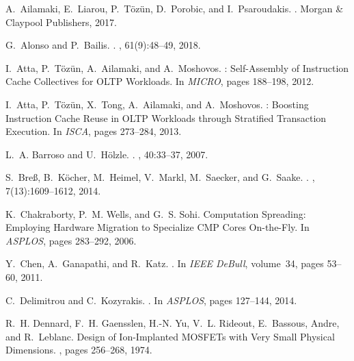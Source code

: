 \documentclass[11pt]{article}
\begin{document}
\begin{thebibliography}{10}
\begin{small}
\itemsep=1pt
%
%
A.~Ailamaki, E.~Liarou, P.~T\"oz\"un, D.~Porobic, and I.~Psaroudakis.
.
\newblock Morgan {\&} Claypool Publishers, 2017.

G.~Alonso and P.~Bailis.
.
, 61(9):48--49, 2018.

I.~Atta, P.~T\"oz\"un, A.~Ailamaki, and A.~Moshovos.
: {S}elf-{A}ssembly of {I}nstruction {C}ache {C}ollectives for
  {OLTP} {W}orkloads.
\newblock In {\em MICRO}, pages 188--198, 2012.

I.~Atta, P.~T\"oz\"un, X.~Tong, A.~Ailamaki, and A.~Moshovos.
: {B}oosting {I}nstruction {C}ache {R}euse in {OLTP}
  {W}orkloads through {S}tratified {T}ransaction {E}xecution.
\newblock In {\em ISCA}, pages 273--284, 2013.

L.~A. Barroso and U.~H\"{o}lzle.
.
, 40:33--37, 2007.

S.~Bre\ss, B.~K\"{o}cher, M.~Heimel, V.~Markl, M.~Saecker, and G.~Saake.
.
, 7(13):1609--1612, 2014.

K.~Chakraborty, P.~M. Wells, and G.~S. Sohi.
\newblock Computation {S}preading: {E}mploying {H}ardware {M}igration to
  {S}pecialize {CMP} {C}ores {O}n-the-{F}ly.
\newblock In {\em ASPLOS}, pages 283--292, 2006.

Y.~Chen, A.~Ganapathi, and R.~Katz.
.
\newblock In {\em IEEE DeBull}, volume~34, pages 53--60, 2011.

C.~Delimitrou and C.~Kozyrakis.
.
\newblock In {\em ASPLOS}, pages 127--144, 2014.

R.~H. Dennard, F.~H. Gaensslen, H.-N. Yu, V.~L. Rideout, E.~Bassous, Andre, and
  R.~Leblanc.
\newblock Design of {I}on-{I}mplanted {MOSFET}s with {V}ery {S}mall {P}hysical
  {D}imensions.
, pages 256--268, 1974.


\end{small}
\end{thebibliography}
\end{document}
